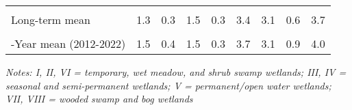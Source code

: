 \documentclass[
  12pt,
]{article}
\begin{document}
\begin{table}[!h]
{\begin{threeparttable}
\begin{tabular}[t]{>{\centering\arraybackslash}m{8em}cccccccc}
\cellcolor{gray!6}{\% Change from previous year} & \cellcolor{gray!6}{-89.9\%} & \cellcolor{gray!6}{-74.3\%} & \cellcolor{gray!6}{-80.7\%} & \cellcolor{gray!6}{-100.0\%} & \cellcolor{gray!6}{-83.2\%} & \cellcolor{gray!6}{-94.7\%} & \cellcolor{gray!6}{-96.0\%} & \cellcolor{gray!6}{-94.8\%}\\
Long-term mean & 1.3 & 0.3 & 1.5 & 0.3 & 3.4 & 3.1 & 0.6 & 3.7\\
\cellcolor{gray!6}{\% Change from long-term mean} & \cellcolor{gray!6}{-93.5\%} & \cellcolor{gray!6}{-66.1\%} & \cellcolor{gray!6}{-75.1\%} & \cellcolor{gray!6}{-100.0\%} & \cellcolor{gray!6}{-83.3\%} & \cellcolor{gray!6}{-91.7\%} & \cellcolor{gray!6}{-96.2\%} & \cellcolor{gray!6}{-92.5\%}\\
10-Year mean (2012-2022) & 1.5 & 0.4 & 1.5 & 0.3 & 3.7 & 3.1 & 0.9 & 4.0\\
\bottomrule
\end{tabular}
\begin{tablenotes}
\small
\item \textit{Notes: I, II, VI = temporary, wet meadow, and shrub swamp
    wetlands; III, IV = seasonal and semi-permanent wetlands; V =
    permanent/open water wetlands; VII, VIII = wooded swamp and bog wetlands} 
\item 
\end{tablenotes}
\end{threeparttable}}
\end{table}

\newpage
\end{document}

